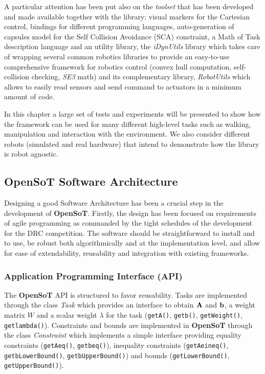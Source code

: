 A particular attention has been put also on the \emph{toolset} that has been developed and made available together with the library: visual markers for the Cartesian control, bindings for different programming languages, auto-generation of capsules model for the Self Collision Avoidance (SCA) constraint, a Math of Task description language and an utility library, the \emph{iDynUtils} library which takes care of wrapping several common robotics libraries to provide an easy-to-use comprehensive framework for robotics control (convex hull computation, self-collision checking, \emph{SE3} math) and its complementary library, \emph{RobotUtils} which allows to easily read sensors and send command to actuators in a minimum amount of code. 

In this chapter a large set of tests and experiments will be presented to show how the framework can be used for many different high-level tasks such as walking, manipulation and interaction with the environment. We also consider different robots (simulated and real hardware) that intend to demonstrate how the library is robot agnostic.

\subsection{OpenSoT Software Architecture}
\label{sec:software_architecture}
Designing a good Software Architecture has been a crucial step in the development of \textbf{OpenSoT}. Firstly, the design has been focused on requirements of agile programming as commanded by the tight schedules of the development for the DRC competition. The software should be straightforward to install and to use, be robust both algorithmically and at the implementation level, and allow for ease of extendability, reusability and integration with existing frameworks.

\subsubsection{Application Programming Interface (API)}
The \textbf{OpenSoT} API is structured to favor reusability.
Tasks are implemented through the class \emph{Task} which provides an interface to obtain $\mathbf{A}$ and $\mathbf{b}$, a weight matrix $W$ and a scalar weight $\lambda$ for the task (\texttt{\small getA()}, \texttt{\small getb()}, \texttt{\small getWeight()}, \texttt{\small getlambda()}).
Constraints and bounds are implemented in \textbf{OpenSoT} through the class \emph{Constraint} which implements a simple interface providing equality constraints (\texttt{\small getAeq()}, \texttt{\small getbeq()}), inequality constraints (\texttt{\small getAeineq()}, \texttt{\small getbLowerBound()}, \texttt{\small getbUpperBound()}) and bounds (\texttt{\small getLowerBound()}, \texttt{\small getUpperBound()}).

